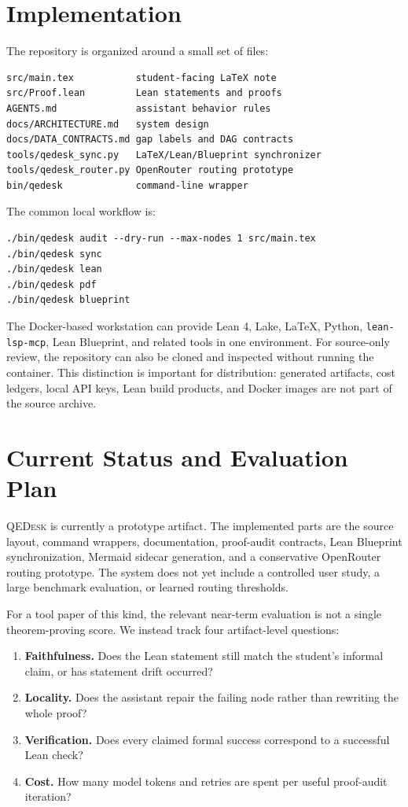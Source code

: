 \documentclass[11pt]{article}
\newcommand{\qedesk}{\textsc{QEDesk}}
\newcommand{\lean}{Lean 4}
\begin{document}
\section{Implementation}

The repository is organized around a small set of files:

\begin{lstlisting}
src/main.tex           student-facing LaTeX note
src/Proof.lean         Lean statements and proofs
AGENTS.md              assistant behavior rules
docs/ARCHITECTURE.md   system design
docs/DATA_CONTRACTS.md gap labels and DAG contracts
tools/qedesk_sync.py   LaTeX/Lean/Blueprint synchronizer
tools/qedesk_router.py OpenRouter routing prototype
bin/qedesk             command-line wrapper
\end{lstlisting}

The common local workflow is:

\begin{lstlisting}
./bin/qedesk audit --dry-run --max-nodes 1 src/main.tex
./bin/qedesk sync
./bin/qedesk lean
./bin/qedesk pdf
./bin/qedesk blueprint
\end{lstlisting}

The Docker-based workstation can provide \lean{}, Lake, LaTeX, Python,
\texttt{lean-lsp-mcp}, Lean Blueprint, and related tools in one environment.
For source-only review, the repository can also be cloned and inspected without
running the container.  This distinction is important for distribution:
generated artifacts, cost ledgers, local API keys, Lean build products, and
Docker images are not part of the source archive.

\section{Current Status and Evaluation Plan}

\qedesk{} is currently a prototype artifact.  The implemented parts are the
source layout, command wrappers, documentation, proof-audit contracts, Lean
Blueprint synchronization, Mermaid sidecar generation, and a conservative
OpenRouter routing prototype.  The system does not yet include a controlled
user study, a large benchmark evaluation, or learned routing thresholds.

For a tool paper of this kind, the relevant near-term evaluation is not a
single theorem-proving score.  We instead track four artifact-level questions:

\begin{enumerate}[leftmargin=2em]
  \item \textbf{Faithfulness.}  Does the Lean statement still match the
  student's informal claim, or has statement drift occurred?
  \item \textbf{Locality.}  Does the assistant repair the failing node rather
  than rewriting the whole proof?
  \item \textbf{Verification.}  Does every claimed formal success correspond to
  a successful Lean check?
  \item \textbf{Cost.}  How many model tokens and retries are spent per useful
  proof-audit iteration?
\end{enumerate}
\end{document}
